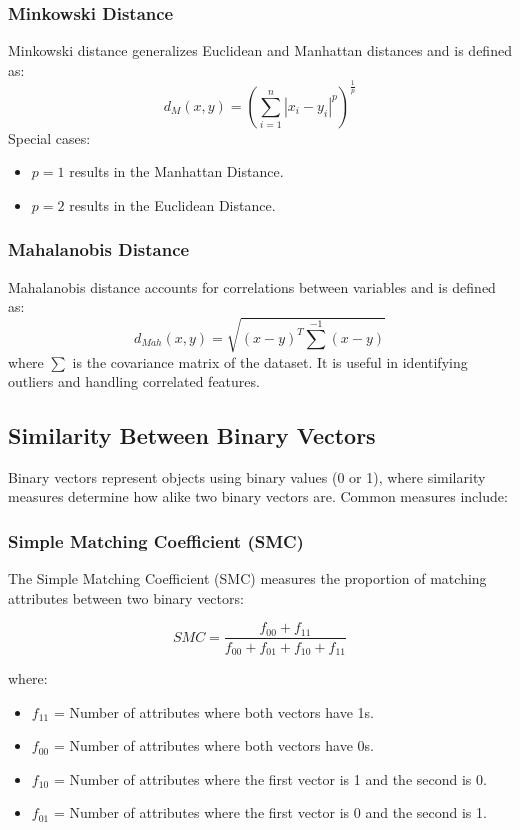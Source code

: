 \documentclass[a4paper,12pt]{article}
\begin{document}
\subsubsection{Minkowski Distance}
Minkowski distance generalizes Euclidean and Manhattan distances and is defined as:
\begin{equation}
d_M(x, y) = \left( \sum_{i=1}^{n} |x_i - y_i|^p \right)^{\frac{1}{p}}
\end{equation}
Special cases:
\begin{itemize}
    \item \( p = 1 \) results in the Manhattan Distance.
    \item \( p = 2 \) results in the Euclidean Distance.
\end{itemize}

\subsubsection{Mahalanobis Distance}
Mahalanobis distance accounts for correlations between variables and is defined as:
\begin{equation}
d_{Mah}(x, y) = \sqrt{(x - y)^T {\sum}^{-1} (x - y)}
\end{equation}
where \( \sum \) is the covariance matrix of the dataset. It is useful in identifying outliers and handling correlated features.

\subsection{Similarity Between Binary Vectors}

Binary vectors represent objects using binary values (0 or 1), where similarity measures determine how alike two binary vectors are. Common measures include:

\subsubsection{Simple Matching Coefficient (SMC)}
The Simple Matching Coefficient (SMC) measures the proportion of matching attributes between two binary vectors:

\begin{equation}
SMC = \frac{f_{00} + f_{11}}{f_{00} + f_{01} + f_{10} + f_{11}}
\end{equation}

where:
\begin{itemize}
    \item \( f_{11} \) = Number of attributes where both vectors have 1s.
    \item \( f_{00} \) = Number of attributes where both vectors have 0s.
    \item \( f_{10} \) = Number of attributes where the first vector is 1 and the second is 0.
    \item \( f_{01} \) = Number of attributes where the first vector is 0 and the second is 1.
\end{itemize}
\end{document}
